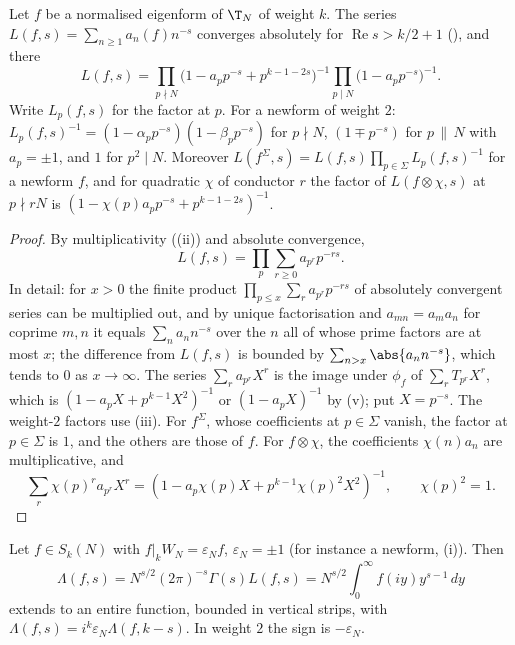 \begin{proposition}\label{prop:hecke:euler-product}
Let $f$ be a normalised eigenform of $\T_N$ of weight $k$. The series $L(f,s)=\sum_{n\ge1}a_n(f)n^{-s}$ converges absolutely for $\operatorname{Re}s>k/2+1$ (), and there
\[
L(f,s)=\prod_{p\nmid N}\bigl(1-a_pp^{-s}+p^{k-1-2s}\bigr)^{-1}\prod_{p\mid N}\bigl(1-a_pp^{-s}\bigr)^{-1}.
\]
Write $L_p(f,s)$ for the factor at $p$. For a newform of weight $2$: $L_p(f,s)^{-1}=(1-\alpha_pp^{-s})(1-\beta_pp^{-s})$ for $p\nmid N$, $(1\mp p^{-s})$ for $p\,\|\,N$ with $a_p=\pm1$, and $1$ for $p^2\mid N$. Moreover
$L(f^\Sigma,s)=L(f,s)\prod_{p\in\Sigma}L_p(f,s)^{-1}$ for a newform $f$, and for quadratic $\chi$ of conductor $r$ the factor of $L(f\otimes\chi,s)$ at $p\nmid rN$ is
$(1-\chi(p)a_pp^{-s}+p^{k-1-2s})^{-1}$.
\end{proposition}

\begin{proof}
By multiplicativity ((ii)) and absolute convergence,
\[
L(f,s)=\prod_p\sum_{r\ge0}a_{p^r}p^{-rs}.
\]
In detail: for $x>0$ the finite product $\prod_{p\le x}\sum_ra_{p^r}p^{-rs}$ of absolutely convergent series can be multiplied out, and by unique factorisation and
$a_{mn}=a_ma_n$ for coprime $m,n$ it equals $\sum_na_nn^{-s}$ over the $n$ all of whose prime factors are at most $x$; the difference from $L(f,s)$ is bounded by $\sum_{n>x}\abs{a_nn^{-s}}$,
which tends to $0$ as $x\to\infty$.
The series $\sum_ra_{p^r}X^r$ is the image under $\phi_f$ of $\sum_rT_{p^r}X^r$, which is $(1-a_pX+p^{k-1}X^2)^{-1}$ or $(1-a_pX)^{-1}$ by (v); put $X=p^{-s}$. The weight-$2$ factors use (iii). For $f^\Sigma$, whose
coefficients at $p\in\Sigma$ vanish, the factor at $p\in\Sigma$ is $1$, and the others are those of $f$. For $f\otimes\chi$, the coefficients $\chi(n)a_n$ are multiplicative, and
\[
\sum_r\chi(p)^ra_{p^r}X^r=(1-a_p\chi(p)X+p^{k-1}\chi(p)^2X^2)^{-1},\qquad\chi(p)^2=1.
\]
\end{proof}

\begin{theorem}\label{thm:hecke:functional-equation}
Let $f\in S_k(N)$ with $f|_kW_N=\varepsilon_Nf$, $\varepsilon_N=\pm1$ (for instance a newform, (i)). Then
\[
\Lambda(f,s)=N^{s/2}(2\pi)^{-s}\Gamma(s)L(f,s)=N^{s/2}\int_0^\infty f(iy)y^{s-1}\,dy
\]
extends to an entire function, bounded in vertical strips, with $\Lambda(f,s)=i^k\varepsilon_N\Lambda(f,k-s)$. In weight $2$ the sign is $-\varepsilon_N$.
\end{theorem}


